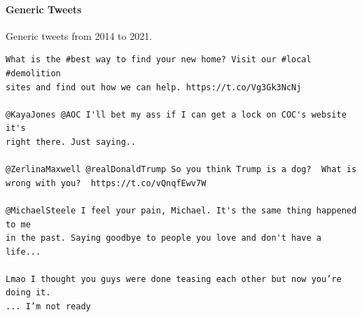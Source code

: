 \documentclass[12pt, letterpaper]{article}
\begin{document}
\paragraph*{Generic Tweets}Generic tweets from 2014 to 2021.
{
\color{gray}
\begin{verbatim}
What is the #best way to find your new home? Visit our #local #demolition 
sites and find out how we can help. https://t.co/Vg3Gk3NcNj

@KayaJones @AOC I'll bet my ass if I can get a lock on COC's website it's
right there. Just saying..

@ZerlinaMaxwell @realDonaldTrump So you think Trump is a dog?  What is 
wrong with you?  https://t.co/vQnqfEwv7W

@MichaelSteele I feel your pain, Michael. It's the same thing happened to me
in the past. Saying goodbye to people you love and don't have a life...

Lmao I thought you guys were done teasing each other but now you’re doing it.
... I’m not ready
\end{verbatim}
}
\end{document}
